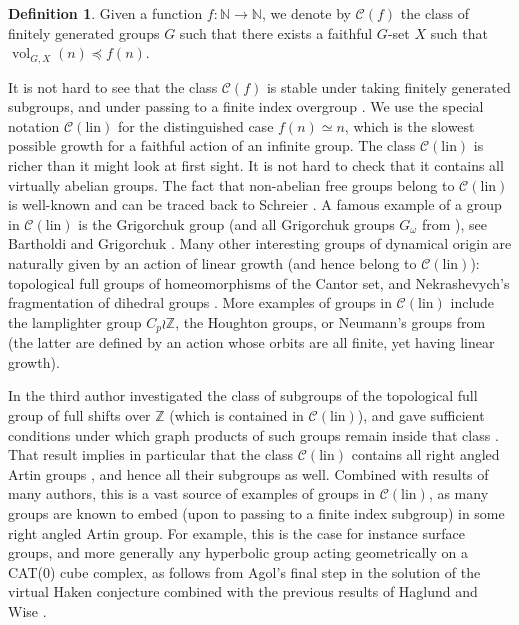 \documentclass[11pt]{amsart}
\newcommand{\Z}{\ensuremath{\mathbb{Z}}}%
\newcommand{\N}{\ensuremath{\mathbb{N}}}%
\newcommand{\vol}{\ensuremath{\operatorname{vol}}}%
\newcommand{\Class}{\ensuremath{\mathcal{C}}}
\newcommand{\Clin}{\ensuremath{\mathcal{C}(\mathrm{lin})}}
\theoremstyle{definition}
\newtheorem{defin}{Definition}[section]
\theoremstyle{plain}
\theoremstyle{remark}
\begin{document}
\begin{defin} \label{defin-class}
Given a function $f\colon \N\to\N$, we denote by $\Class(f)$ the class of finitely generated groups $G$ such that there exists a faithful $G$-set $X$ such that $\vol_{G, X}(n) \preccurlyeq f(n)$.
\end{defin}

It is not hard to see that the class $\Class(f)$ is stable under taking finitely generated subgroups, and under passing to a finite index overgroup \cite[\S 1.3]{LB-MB-solv}. We use the special notation $\Clin$ for the distinguished case $f(n)\simeq n$, which is the slowest possible growth for a faithful action of an infinite group. The class $\Clin$ is richer than it might look at first sight. It is not hard to check that it contains all virtually abelian groups. The fact that non-abelian free groups belong to $\Clin$ is well-known and can be traced back to Schreier \cite{Sch}.  A famous example of a group in $\Clin$ is the Grigorchuk group (and all Grigorchuk groups $G_\omega$ from \cite{Gri-growth}),  see Bartholdi and Grigorchuk \cite{Bar-Gri-Hecke}. Many other interesting groups of dynamical origin are naturally given by an action of linear growth (and hence belong to $\Clin$): topological full groups of homeomorphisms of the Cantor set, and Nekrashevych's fragmentation of dihedral groups \cite{Nek-frag}.  More examples of groups in $\Clin$ include the lamplighter group $C_p\wr \Z$, the Houghton groups, or Neumann's groups from \cite{Neumann-manygroups} (the latter are defined by an action whose orbits are all finite, yet having linear growth). 

In \cite{Salo-graph-prod} the third author investigated the class of subgroups of the topological full group of full shifts over $\Z$ (which is contained in $\Clin$), and gave sufficient conditions under which graph products of such groups remain inside that class \cite[Theorem 3]{Salo-graph-prod}. That result implies in particular that the class $\Clin$ contains all right angled Artin groups  \cite[Theorem 1]{Salo-graph-prod}, and hence all their subgroups as well. Combined with results of many authors, this is a vast source of examples of groups in $\Clin$, as many groups are known to embed (upon to passing to a finite index subgroup) in some right angled Artin group. For example, this is the case for instance surface groups, and more generally any hyperbolic group acting geometrically on a CAT(0) cube complex, as follows from Agol's final step in the solution of the virtual Haken conjecture \cite{Agol} combined with the previous results of Haglund and Wise \cite{Ha-Wi1}. 
 
\end{document}
